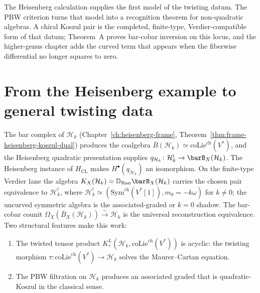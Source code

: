 The Heisenberg calculation supplies the first model of the
twisting datum. The PBW criterion turns that model into a
recognition theorem for non-quadratic algebras. A chiral Koszul
pair is the completed, finite-type, Verdier-compatible form of
that datum; Theorem~A proves bar-cobar inversion on this locus,
and the higher-genus chapter adds the curved term that appears
when the fiberwise differential no longer squares to zero.



\section{From the Heisenberg example to general twisting data}
\label{sec:chiral-twisting-data}

The bar complex of $\mathcal{H}_k$ (Chapter~\ref{ch:heisenberg-frame},
Theorem~\ref{thm:frame-heisenberg-koszul-dual})
produces the coalgebra $\bar{B}(\mathcal{H}_k)
\simeq \mathrm{coLie}^{\mathrm{ch}}(V^*)$,
and the Heisenberg quadratic presentation supplies
$q_{\mathcal H_k}\colon\mathcal H_k^{\mathrm i}\to
\barB_X(\mathcal H_k)$.  The Heisenberg instance of
$H_{\mathrm{CL}}$ makes $H^\bullet(q_{\mathcal H_k})$ an
isomorphism. On the finite-type Verdier lane the algebra
$K_X(\mathcal H_k)=\mathbb D_{\operatorname{Ran}}
\barB_X(\mathcal H_k)$ carries the chosen pair equivalence to
$\mathcal{H}_k^!$, where
$\mathcal{H}_k^!
\simeq(\mathrm{Sym}^{\mathrm{ch}}(V^*[1]),m_0=-k\omega)$
for \(k\ne0\); the uncurved symmetric algebra is the associated-graded
or \(k=0\) shadow.
The bar-cobar counit
$\Omega_X(\bar{B}_X(\mathcal{H}_k)) \xrightarrow{\;\sim\;} \mathcal{H}_k$
is the universal reconstruction equivalence. Two structural features make this work:

\begin{enumerate}
\item The twisted tensor product
 $K_\tau^L(\mathcal{H}_k, \mathrm{coLie}^{\mathrm{ch}}(V^*))$
 is acyclic: the twisting morphism
 $\tau\colon \mathrm{coLie}^{\mathrm{ch}}(V^*) \to \mathcal{H}_k$
 solves the Maurer--Cartan equation.
\item The PBW filtration on $\mathcal{H}_k$ produces an
 associated graded that is quadratic-Koszul in the classical sense.
\end{enumerate}

